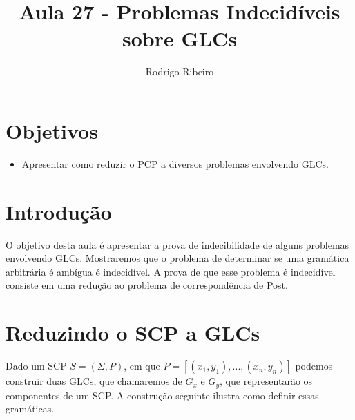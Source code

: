 \documentclass[a4paper]{article}
\theoremstyle{definition}
\begin{document}
\title{Aula 27 - Problemas Indecidíveis sobre GLCs}
  \author{Rodrigo Ribeiro}

  \maketitle

  \pagestyle{fancy}


  \section*{Objetivos}

  \begin{itemize}
    \item Apresentar como reduzir o PCP a diversos problemas envolvendo GLCs.
  \end{itemize}


  \section{Introdução}

  O objetivo desta aula é apresentar a prova de indecibilidade de alguns
  problemas envolvendo GLCs. Mostraremos que o problema de determinar se
  uma gramática arbitrária é ambígua é indecidível. A prova de que esse
  problema é indecidível consiste em uma redução ao problema de correspondência
  de Post.


  \section{Reduzindo o SCP a GLCs}

  Dado um SCP $S = (\Sigma, P)$, em que $P = [(x_1,y_1),...,(x_n,y_n)]$
  podemos construir duas GLCs, que chamaremos de $G_x$ e $G_y$, que
  representarão os componentes de um SCP. A construção seguinte ilustra como
  definir essas gramáticas.
  
\end{document}

